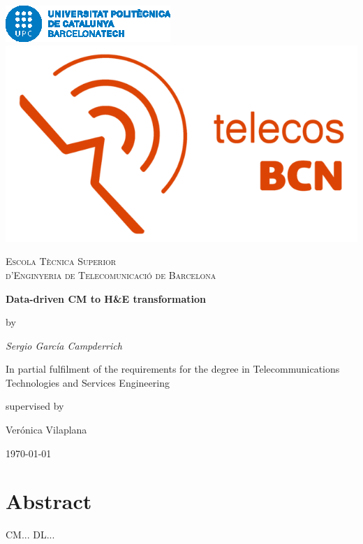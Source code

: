 \documentclass[a4paper,12pt,titlepage]{article}
\begin{document}
\begin{titlepage}
\centering

\includegraphics[height=0.07\textheight]{logo_barcelonatech}\hspace{0.5cm}
\includegraphics[height=0.07\textheight]{logo_telecos_2018}\par\vspace{1cm}

{\scshape\LARGE Escola Tècnica Superior \\ d'Enginyeria de Telecomunicació de Barcelona \par}\vspace{3mm}

{\huge\bfseries Data-driven CM to H\&E transformation\par}\vspace{2cm}

by\par
{\Large\itshape Sergio García Campderrich\par}
In partial fulfilment of the requirements for the degree in Telecommunications Technologies and Services Engineering\vfill

supervised by\par
Verónica Vilaplana

\vfill

{\large \today\par}
\end{titlepage}

\clearpage
\thispagestyle{empty}
\null\newpage

\section*{Abstract}
CM...
DL...
\thispagestyle{empty}
\end{document}
